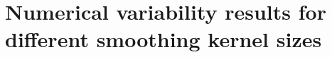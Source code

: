 \documentclass[lettersize,journal]{IEEEtran}
\begin{document}



\appendix

\section*{Numerical variability results for different smoothing kernel sizes}
\label{appendix:numerical_uncertainty}


\end{document}
